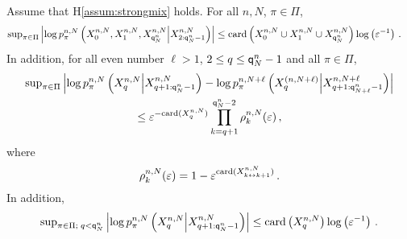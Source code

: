 \begin{lemma}
\label{lem:exp:forget}
Assume that H\ref{assum:strongmix} holds. For all $n,N$, $\pi\in\Pi$,
\begin{align}
\mathrm{sup}_{\pi\in\Pi}\left|\log p_{\pi}^{n,N}\left(X_{0}^{n,N},X_{1}^{n,N},X_{{\mathsf{q}}^{n}_{N}}^{n,N}\middle|X_{2:{\mathsf{q}}^{n}_{N}-1}^{n,N}\right)\right|&\le \mathrm{card}\left(X_{0}^{n,N}\cup X_{1}^{n,N}\cup X_{{\mathsf{q}}^{n}_{N}}^{n,N}\right)\log \left(\varepsilon^{-1}\right)\label{eq:bound:end}\,.
\end{align}
In addition,  for all even number $\ell>1$,  $2\le q\le {\mathsf{q}}^{n}_{N}-1$ and all $\pi\in\Pi$,
\begin{multline}
\mathrm{sup}_{\pi\in\Pi}\left|\log p_{\pi}^{n,N}\left(X_{q}^{n,N}\middle|X_{q+1:{\mathsf{q}}^{n}_{N}-1}^{n,N}\right) - \log p_{\pi}^{n,N+\ell}\left(X_{q}^{(n,N+\ell)}\middle|X_{q+1:{\mathsf{q}}^{n}_{N+\ell}-1}^{n,N+\ell}\right) \right|\\
\leq \varepsilon^{-\mathrm{card}(X^{n,N}_{q})}\prod_{k=q+1}^{{\mathsf{q}}^{n}_{N}-2}\rho^{n,N}_k(\varepsilon) \,,\label{eq:bound:forget}
\end{multline}
where 
\begin{equation}
\label{eq:defrho}
\rho^{n,N}_k(\varepsilon) = 1- \varepsilon^{\mathrm{card}(X^{n,N}_{k\leftrightarrow k+1})}\,.
\end{equation}
In addition,
\begin{equation}
\label{eq:bound:loglik}
\mathrm{sup}_{\pi\in\Pi;\;q< {\mathsf{q}}^{n}_{N}}\left|\log p_{\pi}^{n,N}\left(X_{q}^{n,N}\middle|X_{q+1:{\mathsf{q}}^{n}_{N}-1}^{n,N}\right)\right|\le \mathrm{card}\left(X_{q}^{n,N}\right)\log \left(\varepsilon^{-1}\right)\,. 
\end{equation}
\end{lemma}
